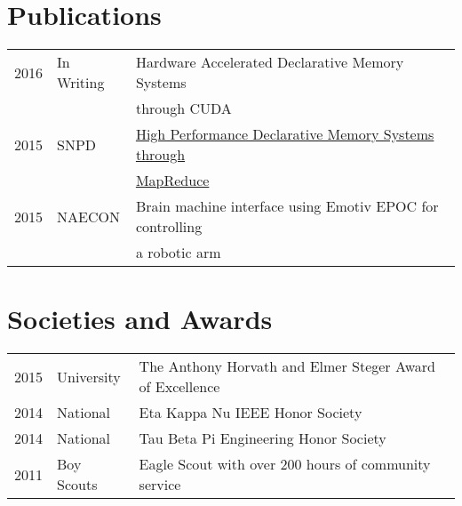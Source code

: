 \documentclass[letterpaper]{deedy-resume} %
\begin{document}
\begin{minipage}[t]{0.66\textwidth}
\sectionspace %



\section{Publications} 

\begin{tabular}{rll}
2016 	 & In Writing  & Hardware Accelerated Declarative Memory Systems \\
 		 & 			   & through CUDA\\
2015	 & SNPD   & \href{http://ieeexplore.ieee.org/xpl/articleDetails.jsp?arnumber=7176183}{High Performance Declarative Memory Systems through}\\
 		 & 			   & \href{http://ieeexplore.ieee.org/xpl/articleDetails.jsp?arnumber=7176183}{MapReduce}\\
2015 	 & NAECON  & Brain machine interface using Emotiv EPOC for controlling \\
		 & 			   & a robotic arm
\end{tabular}

\sectionspace %


\section{Societies and Awards} 

\begin{tabular}{rll}
2015 & University & The Anthony Horvath and Elmer Steger Award of Excellence \\
2014 & National & Eta Kappa Nu IEEE Honor Society\\
2014 & National & Tau Beta Pi Engineering Honor Society\\
2011 & Boy Scouts & Eagle Scout with over 200 hours of community service\\
\end{tabular}

\sectionspace %


\end{minipage} %
\end{document}
